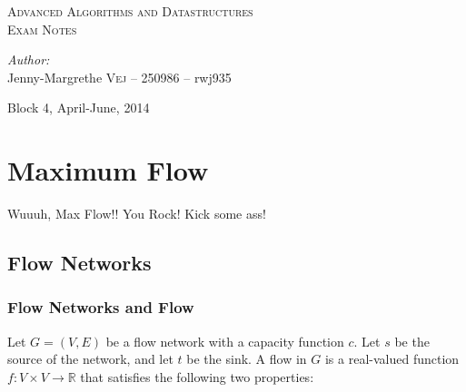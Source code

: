 \documentclass[12pt]{article}
\begin{document}
\begin{titlepage}

\centering 

\textsc{\Large Advanced Algorithms and Datastructures}\\[0.5cm] 
\textsc{\large Exam Notes}\\[0.5cm] 

\vfill

\emph{Author:}
\\
Jenny-Margrethe \textsc{Vej} -- 250986 -- rwj935
\vspace{20mm}

{\large Block 4, April-June, 2014}\\[3cm] 

\end{titlepage}

\tableofcontents
\newpage


\section{Maximum Flow}
Wuuuh, Max Flow!! You Rock! Kick some ass!

\subsection{Flow Networks}
\subsubsection{Flow Networks and Flow}
Let $G = (V, E)$ be a flow network with a capacity function $c$. Let $s$ be the source of the network, and let $t$ be the sink. A flow in $G$ is a real-valued function $f : V \times V \rightarrow \mathbb{R}$ that satisfies the following two properties:\\
\end{document}
